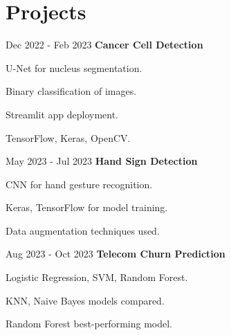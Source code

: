 \section{Projects}
\begin{twocolentry}{Dec 2022 - Feb 2023}
    \textbf{Cancer Cell Detection}
\end{twocolentry}
\vspace{0.10 cm}
\begin{onecolentry}
    \begin{highlights}
        \item U-Net for nucleus segmentation.
        \item Binary classification of images.
        \item Streamlit app deployment.
        \item TensorFlow, Keras, OpenCV.
    \end{highlights}
\end{onecolentry}
\vspace{0.2 cm}
\begin{twocolentry}{May 2023 - Jul 2023}
    \textbf{Hand Sign Detection}
\end{twocolentry}
\vspace{0.10 cm}
\begin{onecolentry}
    \begin{highlights}
        \item CNN for hand gesture recognition.
        \item Keras, TensorFlow for model training.
        \item Data augmentation techniques used.
    \end{highlights}
\end{onecolentry}
\vspace{0.2 cm}
\begin{twocolentry}{Aug 2023 - Oct 2023}
    \textbf{Telecom Churn Prediction}
\end{twocolentry}
\vspace{0.10 cm}
\begin{onecolentry}
    \begin{highlights}
        \item Logistic Regression, SVM, Random Forest.
        \item KNN, Naive Bayes models compared.
        \item Random Forest best-performing model.
    \end{highlights}
\end{onecolentry}
\vspace{0.2 cm}
